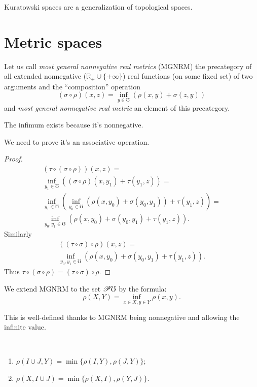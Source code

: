Kuratowski spaces are a generalization of topological spaces.

\chapter{Metric spaces}

Let us call \emph{most general nonnegative real metrics} (MGNRM) the precategory of all extended nonnegative ($\mathbb{R}_{+}\cup\{+\infty\}$) real functions (on some fixed set) of two arguments and the ``composition'' operation
\[ (\sigma\circ\rho)(x,z) = \inf_{y\in\mho}(\rho(x,y)+\sigma(z,y)) \]
and \emph{most general nonnegative real metric} an element of this precategory.

\begin{rem}
The infimum exists because it's nonnegative.
\end{rem}

We need to prove it's an associative operation.

\begin{proof}
\begin{multline*}
(\tau\circ(\sigma\circ\rho))(x,z) = \\
\inf_{y_1\in\mho}((\sigma\circ\rho)(x,y_1)+\tau(y_1,z)) = \\
\inf_{y_1\in\mho}(\inf_{y_0\in\mho}(\rho(x,y_0)+\sigma(y_0,y_1))+\tau(y_1,z)) = \\
\inf_{y_0,y_1\in\mho}(\rho(x,y_0)+\sigma(y_0,y_1)+\tau(y_1,z)).
\end{multline*}
Similarly 
\begin{multline*}
((\tau\circ\sigma)\circ\rho)(x,z) = \\
\inf_{y_0,y_1\in\mho}(\rho(x,y_0)+\sigma(y_0,y_1)+\tau(y_1,z)).
\end{multline*}
Thus $\tau\circ(\sigma\circ\rho)=(\tau\circ\sigma)\circ\rho$.
\end{proof}

\begin{defn}
We extend MGNRM to the set $\mathscr{P}\mho$ by the formula:
\[ \rho(X,Y) = \inf_{x\in X,y\in Y}\rho(x,y). \]
\end{defn}

\begin{rem}
This is well-defined thanks to MGNRM being nonnegative and allowing the infinite value.
\end{rem}

\begin{prop}
~
\begin{enumerate}
\item $\rho(I\cup J,Y) = \min\{\rho(I,Y), \rho(J,Y)\}$;
\item $\rho(X,I\cup J) = \min\{\rho(X,I), \rho(Y,J)\}$.
\end{enumerate}
\end{prop}

